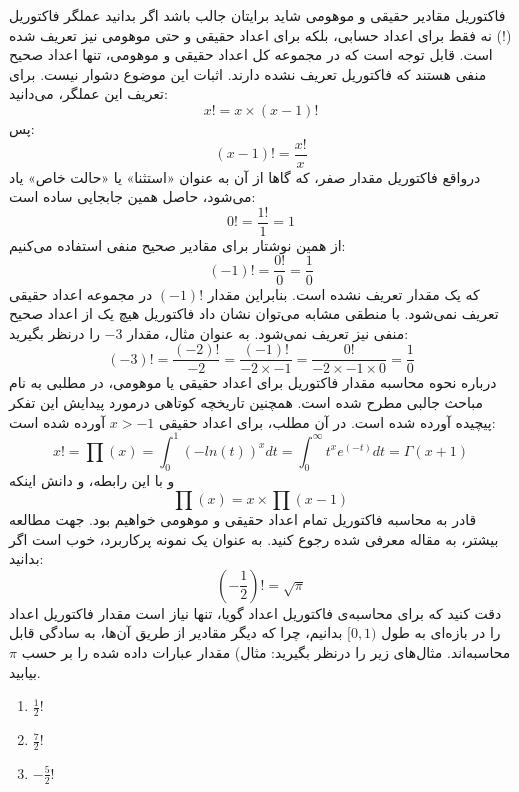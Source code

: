 \begin{extra}{
    فاکتوریل مقادیر حقیقی و موهومی
}
\p
شاید برایتان جالب باشد اگر بدانید عملگر فاکتوریل ($!$)
نه فقط برای اعداد حسابی، بلکه برای اعداد حقیقی و حتی موهومی نیز تعریف شده است.
قابل توجه است که در مجموعه کل اعداد حقیقی و موهومی، تنها اعداد صحیح منفی هستند
که فاکتوریل تعریف نشده دارند. اثبات این موضوع دشوار نیست.
برای تعریف این عملگر، می‌دانید:
$$x! = x \times (x-1)!$$
پس:
$$(x-1)! = \frac{x!}{x}$$
درواقع فاکتوریل مقدار صفر، که گاها از آن به عنوان «استثنا» یا «حالت خاص» یاد می‌شود،
حاصل همین جابجایی ساده است:
$$0! = \frac{1!}{1} = 1$$
\p
از همین نوشتار برای مقادیر صحیح منفی استفاده می‌کنیم:
$$(-1)! = \frac{0!}{0} = \frac{1}{0}$$
که یک مقدار تعریف نشده است. بنابراین مقدار $(-1)!$ در مجموعه اعداد حقیقی تعریف نمی‌شود.
با منطقی مشابه می‌توان نشان داد فاکتوریل هیچ یک از اعداد صحیح منفی نیز تعریف نمی‌شود.
به عنوان مثال، مقدار $-3$ را درنظر بگیرید:
$$(-3)! = \frac{(-2)!}{-2} = \frac{(-1)!}{-2\times-1} = \frac{0!}{-2\times-1\times 0} = \frac{1}{0}$$
\p
درباره نحوه محاسبه مقدار فاکتوریل برای اعداد حقیقی یا موهومی، در مطلبی به نام 
مباحث جالبی مطرح شده است. همچنین تاریخچه کوتاهی درمورد پیدایش این تفکر پیچیده آورده شده است.
\p
در آن مطلب، برای اعداد حقیقی $x>-1$ آورده شده است:
$$x! = \prod(x) = \int_0^1 (-ln(t))^x dt = \int_0^\infty t^x e^(-t) dt = \Gamma(x+1)$$
و با این رابطه، و دانش اینکه
$$\prod(x) = x\times \prod(x-1)$$
قادر به محاسبه فاکتوریل تمام اعداد حقیقی و موهومی خواهیم بود.
جهت مطالعه بیشتر، به مقاله معرفی شده رجوع کنید.
\p
به عنوان یک نمونه پرکاربرد، خوب است اگر بدانید:
$$(-\frac{1}{2})! = \sqrt{\pi}$$
دقت کنید که برای محاسبه‌ی 
فاکتوریل اعداد گویا، تنها نیاز است مقدار فاکتوریل اعداد را در بازه‌ای به طول $[0,1)$ بدانیم، چرا که دیگر مقادیر از طریق آن‌ها، به سادگی قابل محاسبه‌اند.
مثال‌های زیر را درنظر بگیرید:
\p
مثال) مقدار عبارات داده شده را بر حسب
$\pi$
بیابید.
\begin{enumerate}
    \item 
    $\frac{1}{2}!$

    \item 
    $\frac{7}{2}!$
    
    \item 
    $-\frac{5}{2}!$
    
\end{enumerate}

\end{extra}